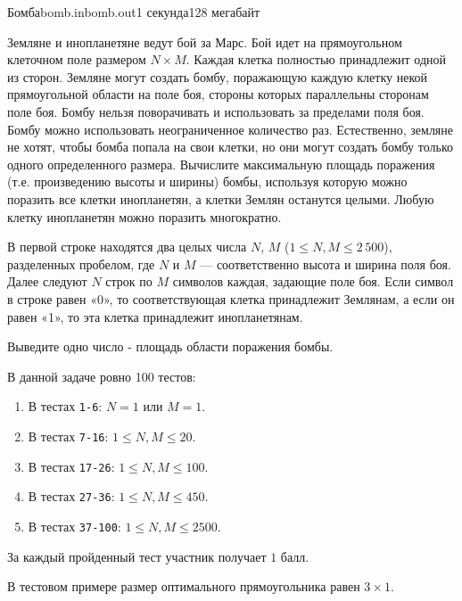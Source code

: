 \begin{problem}{Бомба}{bomb.in}{bomb.out}{1 секунда}{128 мегабайт}

Земляне и инопланетяне ведут бой за Марс. Бой идет на прямоугольном клеточном поле размером $N \times M$. Каждая клетка полностью принадлежит одной из сторон. Земляне могут создать бомбу, поражающую каждую клетку некой прямоугольной области на поле боя, стороны которых параллельны сторонам поле боя. Бомбу нельзя поворачивать и использовать за пределами поля боя. Бомбу можно использовать неограниченное количество раз. Естественно, земляне не хотят, чтобы бомба попала на свои клетки, но они могут создать бомбу только одного определенного размера. Вычислите максимальную площадь поражения (т.е. произведению высоты и ширины) бомбы, используя которую можно поразить все клетки инопланетян, а клетки Землян останутся целыми. Любую клетку инопланетян можно поразить многократно.

\InputFile
В первой строке находятся два целых числа $N$, $M$ ($1 \leq N,M \leq 2\,500$), разделенных пробелом, где $N$ и $M$ — соответственно высота и ширина поля боя. Далее следуют $N$ строк по $M$ символов каждая, задающие поле боя. Если символ в строке равен «0», то соответствующая клетка принадлежит Землянам, а если он равен «1», то эта клетка принадлежит инопланетянам.

\OutputFile
Выведите одно число - площадь области поражения бомбы.

\Scoring
В данной задаче ровно 100 тестов:
\begin{enumerate}
\item В тестах \texttt{1-6}: $N = 1$ или $M = 1$.
\item В тестах \texttt{7-16}: $1 \leq N,M \leq 20$.
\item В тестах \texttt{17-26}: $1 \leq N,M \leq 100$.
\item В тестах \texttt{27-36}: $1 \leq N,M \leq 450$.
\item В тестах \texttt{37-100}: $1 \leq N,M \leq 2500$.
\end{enumerate}

За каждый пройденный тест участник получает $1$ балл.

\Example

\begin{example}
%
\end{example}

\Note
В тестовом примере размер оптимального прямоугольника равен $3 \times 1$.

\end{problem}

